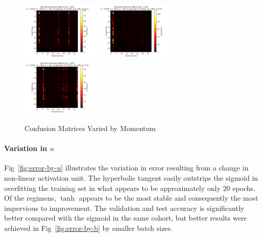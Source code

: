 \documentclass[10pt,epsf]{article}
\begin{document}
{{\begin{figure}[H]
      \includegraphics[width=0.33\textwidth]{./img/64-0.001-160-0.1-sigmoid-1/confusion-matrix-test-255.png}
      \includegraphics[width=0.33\textwidth]{./img/64-0.001-160-0.5-sigmoid-1/confusion-matrix-test-255.png}
      \includegraphics[width=0.33\textwidth]{./img/64-0.001-160-1-sigmoid-1/confusion-matrix-test-255.png}
      \caption{Confusion Matrices Varied by Momentum}
      \label{fig:cm-by-m}
    \end{figure}
    \paragraph{Variation in $u$}{
      Fig~\ref{fig:error-by-u} illustrates the variation in error resulting from a change in
      non-linear activation unit. The hyperbolic tangent easily outstrips the sigmoid in
      overfitting the training set in what appears to be approximately only 20 epochs.
      Of the regimens, $\tanh$ appears to be the most stable and consequently the most
      impervious to improvement. The validation and test accuracy is significantly better
      compared with the sigmoid in the same cohort, but better results were achieved in
      Fig~\ref{fig:error-by-b} by smaller batch sizes.

}}}
\end{document}
